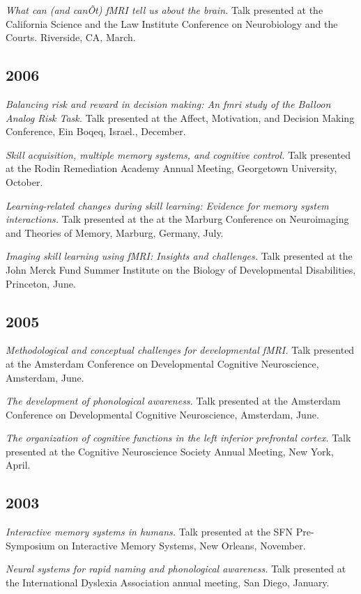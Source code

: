 \documentclass[10pt, letterpaper]{article}
\begin{document}
\textit{What can (and can\~Ot) fMRI tell us about the brain.} Talk presented at the California Science and the Law Institute Conference on Neurobiology and the Courts. Riverside, CA, March.

\subsection*{2006}\textit{Balancing risk and reward in decision making: An fmri study of the Balloon Analog Risk Task.} Talk presented at the Affect, Motivation, and Decision Making Conference, Ein Boqeq, Israel., December.

\textit{Skill acquisition, multiple memory systems, and cognitive control.} Talk presented at the Rodin Remediation Academy Annual Meeting, Georgetown University, October.

\textit{Learning-related changes during skill learning: Evidence for memory system interactions.} Talk presented at the at the Marburg Conference on Neuroimaging and  Theories of Memory, Marburg, Germany, July.

\textit{Imaging skill learning using fMRI: Insights and challenges.} Talk presented at the John Merck Fund Summer Institute on the Biology of Developmental Disabilities, Princeton, June.

\subsection*{2005}\textit{Methodological and conceptual challenges for developmental fMRI.} Talk presented at the Amsterdam Conference on Developmental Cognitive Neuroscience, Amsterdam, June.

\textit{The development of phonological awareness.} Talk presented at the Amsterdam Conference on Developmental Cognitive Neuroscience, Amsterdam, June.

\textit{The organization of cognitive functions in the left inferior prefrontal cortex.} Talk presented at the Cognitive Neuroscience Society Annual Meeting, New York, April.

\subsection*{2003}\textit{Interactive memory systems in humans.} Talk presented at the SFN Pre-Symposium on Interactive Memory Systems, New Orleans, November.

\textit{Neural systems for rapid naming and phonological awareness.} Talk presented at the International Dyslexia Association annual meeting, San Diego, January.
\end{document}
